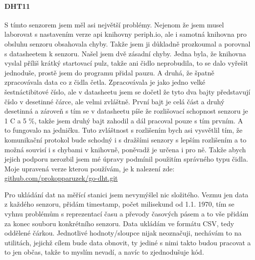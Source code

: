 \paragraph*{DHT11}
S tímto senzorem jsem měl asi největší problémy. Nejenom že jsem musel laborovat s nastavením verze api knihovny 
periph.io, ale i samotná knihovna pro obsluhu senzoru obsahovala chyby. Takže jsem ji důkladně prozkoumal a porovnal 
s datasheetem k senzoru. Našel jsem dvě zásadní chyby. Jedna byla, že knihovna vyslal příliš krátký startovací pulz, 
takže ani čidlo neprobudila, to se dalo vyřešit jednoduše, prostě jsem do programu přidal pauzu. A druhá, že špatně 
zpracovávala data co z čidla četla. Zpracovávala je jako jedno velké šestnáctibitové číslo, ale v datasheetu jsem se 
dočetl že tyto dva bajty představují číslo v desetinné čárce, ale velmi zvláštně. První bajt je celá část a druhý 
desetinná a zároveň s tím se v datasheetu píše že rozlišovací schopnost senzoru je 1 \textdegree C a 5 \%, takže jsem 
druhý bajt zahodil a dál pracoval pouze s tím prvním. A to fungovalo na jedničku. Tuto zvláštnost s rozlišením bych asi 
vysvětlil tím, že komunikační protokol bude schodný i s dražšími senzory s lepším rozlišením a to možná souvisí 
i s chybami v knihovně, poněvadž je určena i pro ně. Takže abych jejich podporu nerozbil jsem mé úpravy podmínil 
použitím správného typu čidla. Moje upravená verze kterou používám, je k nalezení zde: 
\href{https://github.com/prokopparuzek/go-dht.git}{github.com/prokopparuzek/go-dht.git}

Pro ukládání dat na měřící stanici jsem nevymýšlel nic složitého. Vezmu jen data z každého senzoru, přidám timestamp, 
počet milisekund od 1.1. 1970, tím se vyhnu problémům s reprezentací času a převody časových pásem a to vše přidám za 
konec souboru konkrétního senzoru. Data ukládám ve formátu CSV, tedy oddělené čárkou. Jednotlivé hodnoty/sloupce nijak 
neoznačuji, nechávám to na utilitách, jejichž cílem bude data obnovit, ty jediné s nimi takto budou pracovat a to jen 
občas, takže to myslím nevadí, a navíc to zjednodušuje kód.

